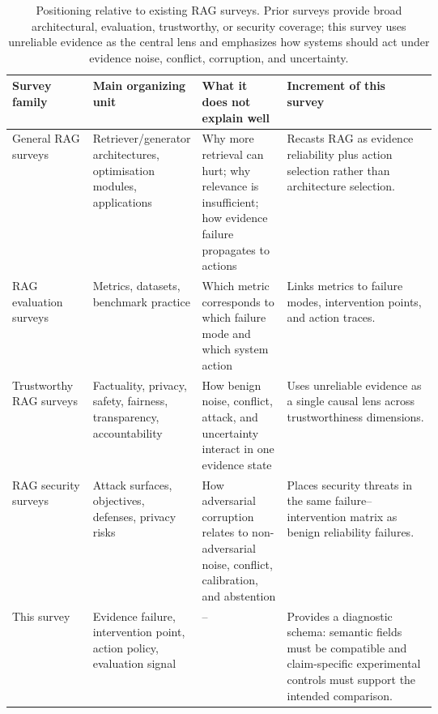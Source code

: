 \begin{table}[t]
\centering
\scriptsize
\renewcommand{\arraystretch}{0.95}
\begin{tabularx}{\linewidth}{>{\raggedright\arraybackslash}p{0.19\linewidth}>{\raggedright\arraybackslash}p{0.22\linewidth}>{\raggedright\arraybackslash}p{0.20\linewidth}X}
\toprule
\textbf{Survey family} & \textbf{Main organizing unit} & \textbf{What it does not explain well} & \textbf{Increment of this survey} \\
\midrule
General RAG surveys \citep{ragSurvey2024,ragComprehensive2025} & Retriever/generator architectures, optimisation modules, applications & Why more retrieval can hurt; why relevance is insufficient; how evidence failure propagates to actions & Recasts RAG as evidence reliability plus action selection rather than architecture selection. \\
RAG evaluation surveys \citep{ragEvaluationSurvey2024} & Metrics, datasets, benchmark practice & Which metric corresponds to which failure mode and which system action & Links metrics to failure modes, intervention points, and action traces. \\
Trustworthy RAG surveys \citep{trustRAGCompass2024,trustworthyRAGSurvey2025} & Factuality, privacy, safety, fairness, transparency, accountability & How benign noise, conflict, attack, and uncertainty interact in one evidence state & Uses unreliable evidence as a single causal lens across trustworthiness dimensions. \\
RAG security surveys \citep{securityRAGSurvey2026,rrag134} & Attack surfaces, objectives, defenses, privacy risks & How adversarial corruption relates to non-adversarial noise, conflict, calibration, and abstention & Places security threats in the same failure--intervention matrix as benign reliability failures. \\
This survey & Evidence failure, intervention point, action policy, evaluation signal & -- & Provides a diagnostic schema: semantic fields must be compatible and claim-specific experimental controls must support the intended comparison. \\
\bottomrule
\end{tabularx}
\caption{Positioning relative to existing RAG surveys. Prior surveys provide broad architectural, evaluation, trustworthy, or security coverage; this survey uses unreliable evidence as the central lens and emphasizes how systems should act under evidence noise, conflict, corruption, and uncertainty.}
\label{tab:survey-comparison}
\end{table}

